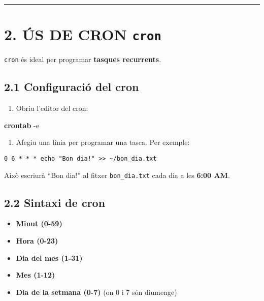 \documentclass[
  12 pt,
  a4paper,
]{article}
\newenvironment{Shaded}{\begin{snugshade}}{\end{snugshade}}
\newcommand{\AttributeTok}[1]{\textcolor[rgb]{0.13,0.29,0.53}{#1}}
\newcommand{\FunctionTok}[1]{\textcolor[rgb]{0.13,0.29,0.53}{\textbf{#1}}}
\providecommand{\tightlist}{%
  \setlength{\itemsep}{0pt}\setlength{\parskip}{0pt}}
\begin{document}
\begin{center}\rule{0.5\linewidth}{0.5pt}\end{center}

\section{\texorpdfstring{2. ÚS DE CRON
\texttt{cron}}{2. ÚS DE CRON cron}}\label{uxfas-de-cron-cron}

\texttt{cron} és ideal per programar \textbf{tasques recurrents}.

\subsection{2.1 Configuració del cron}\label{configuraciuxf3-del-cron}

\begin{enumerate}
\def\labelenumi{\arabic{enumi}.}
\tightlist
\item
  Obriu l'editor del cron:
\end{enumerate}

\begin{Shaded}
\begin{Highlighting}[]
\FunctionTok{crontab} \AttributeTok{{-}e}
\end{Highlighting}
\end{Shaded}

\begin{enumerate}
\def\labelenumi{\arabic{enumi}.}
\setcounter{enumi}{1}
\tightlist
\item
  Afegiu una línia per programar una tasca. Per exemple:
\end{enumerate}

\begin{verbatim}
0 6 * * * echo "Bon dia!" >> ~/bon_dia.txt
\end{verbatim}

Això escriurà ``Bon dia!'' al fitxer \texttt{bon\_dia.txt} cada dia a
les \textbf{6:00 AM}.

\subsection{2.2 Sintaxi de cron}\label{sintaxi-de-cron}

\begin{itemize}
\item
  \textbf{Minut (0-59)}
\item
  \textbf{Hora (0-23)}
\item
  \textbf{Dia del mes (1-31)}
\item
  \textbf{Mes (1-12)}
\item
  \textbf{Dia de la setmana (0-7)} (on 0 i 7 són diumenge)
\end{itemize}
\end{document}
